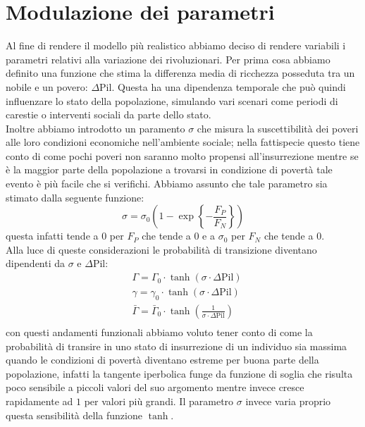 \section{Modulazione dei parametri}
Al fine di rendere il modello più realistico abbiamo deciso di rendere variabili i parametri relativi alla variazione dei rivoluzionari. Per prima cosa abbiamo definito una funzione che stima la differenza media di ricchezza posseduta tra un nobile e un povero: $\Delta\text{Pil}$. Questa ha una dipendenza temporale che può quindi influenzare lo stato della popolazione, simulando vari scenari come periodi di carestie o interventi sociali da parte dello stato.\\
Inoltre abbiamo introdotto un paramento $\sigma$ che misura la suscettibilità dei poveri alle loro condizioni economiche nell'ambiente sociale; nella fattispecie questo tiene conto di come pochi poveri non saranno molto propensi all'insurrezione mentre se è la maggior parte della popolazione a trovarsi in condizione di povertà tale evento è più facile che si verifichi. Abbiamo assunto che tale parametro sia stimato dalla seguente funzione: 
\begin{equation}
	\sigma= \sigma_0\left(1-\exp\left\{-\frac{F_P}{F_N}\right\}\right)
\end{equation}
questa infatti tende a $0$ per $F_P$ che tende a $0$ e a $\sigma_0$ per $F_N$ che tende a $0$.\\
Alla luce di queste considerazioni le probabilità di transizione diventano dipendenti da $\sigma$ e $\Delta\text{Pil}$:
\begin{equation}
	\begin{aligned}
	&\Gamma=\Gamma_{0}\cdot\tanh\left(\sigma\cdot \Delta\text{Pil}\right)\\
	&\gamma=\gamma_{0}\cdot\tanh\left(\sigma\cdot \Delta\text{Pil}\right)\\
	&\bar{\Gamma}=\bar{\Gamma}_{0}\cdot\tanh\left(\frac{1}{\sigma\cdot \Delta\text{Pil}}\right)\\
	\end{aligned}
\end{equation}
con questi andamenti funzionali abbiamo voluto tener conto di come la probabilità di transire in uno stato di insurrezione di un individuo sia massima quando le condizioni di povertà diventano estreme per buona parte della popolazione, infatti la tangente iperbolica funge da funzione di soglia che risulta poco sensibile a piccoli valori del suo argomento mentre invece cresce rapidamente ad $1$ per valori più grandi. Il parametro $\sigma$ invece varia proprio questa sensibilità della funzione $\tanh$.\\
